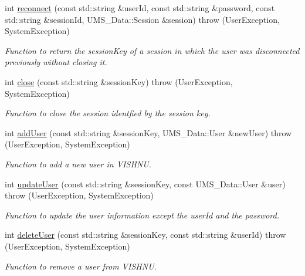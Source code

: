 \begin{DoxyCompactItemize}
int \hyperlink{namespacevishnu_ae120231ba899d68724dc972374206745}{reconnect} (const std::string \&userId, const std::string \&password, const std::string \&sessionId, UMS\_\-Data::Session \&session)  throw (UserException, SystemException)
\begin{DoxyCompactList}\small\item\em Function to return the sessionKey of a session in which the user was disconnected previously without closing it. \item\end{DoxyCompactList}\item 
int \hyperlink{namespacevishnu_a925f5cdd60d012ebd98cd328ed60d398}{close} (const std::string \&sessionKey)  throw (UserException, SystemException)
\begin{DoxyCompactList}\small\item\em Function to close the session identfied by the session key. \item\end{DoxyCompactList}\item 
int \hyperlink{namespacevishnu_ac7cd83030f8f6e990001b238a9f50640}{addUser} (const std::string \&sessionKey, UMS\_\-Data::User \&newUser)  throw (UserException, SystemException)
\begin{DoxyCompactList}\small\item\em Function to add a new user in VISHNU. \item\end{DoxyCompactList}\item 
int \hyperlink{namespacevishnu_a1446b24fda1ed0ca910686635b6bb956}{updateUser} (const std::string \&sessionKey, const UMS\_\-Data::User \&user)  throw (UserException, SystemException)
\begin{DoxyCompactList}\small\item\em Function to update the user information except the userId and the password. \item\end{DoxyCompactList}\item 
int \hyperlink{namespacevishnu_a6c83f6b72fdb7ac3b240f14a19f11786}{deleteUser} (const std::string \&sessionKey, const std::string \&userId)  throw (UserException, SystemException)
\begin{DoxyCompactList}\small\item\em Function to remove a user from VISHNU. \item\end{DoxyCompactList}\item 

\end{DoxyCompactItemize}

